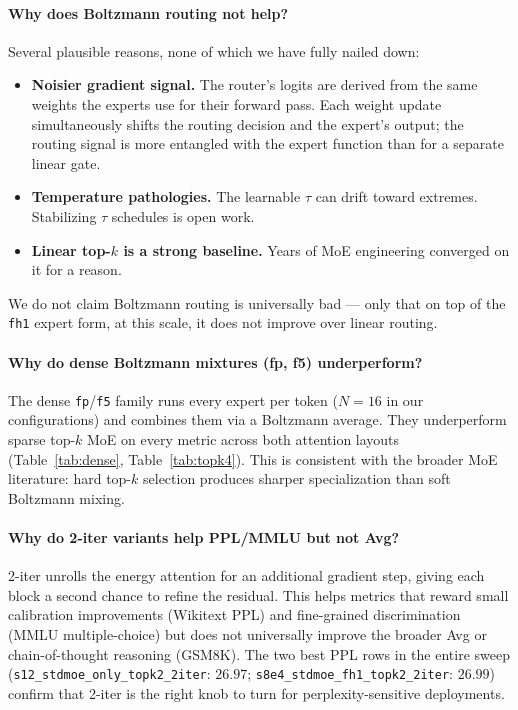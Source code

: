 \documentclass[oneside]{article}
\begin{document}
\paragraph{Why does Boltzmann routing not help?}
Several plausible reasons, none of which we have fully nailed down:
\begin{itemize}[leftmargin=1.5em]
  \item \textbf{Noisier gradient signal.} The router's logits are
        derived from the same weights the experts use for their forward
        pass. Each weight update simultaneously shifts the routing
        decision and the expert's output; the routing signal is more
        entangled with the expert function than for a separate linear
        gate.
  \item \textbf{Temperature pathologies.} The learnable $\tau$ can
        drift toward extremes. Stabilizing $\tau$ schedules is open
        work.
  \item \textbf{Linear top-$k$ is a strong baseline.} Years of MoE
        engineering converged on it for a reason.
\end{itemize}
We do not claim Boltzmann routing is universally bad --- only that on
top of the \texttt{fh1} expert form, at this scale, it does not
improve over linear routing.

\paragraph{Why do dense Boltzmann mixtures (fp, f5) underperform?}
The dense \texttt{fp}/\texttt{f5} family runs every expert per token
($N=16$ in our configurations) and combines them via a Boltzmann
average. They underperform sparse top-$k$ MoE on every metric across
both attention layouts (Table~\ref{tab:dense}, Table~\ref{tab:topk4}).
This is consistent with the broader MoE literature: hard top-$k$
selection produces sharper specialization than soft Boltzmann mixing.

\paragraph{Why do 2-iter variants help PPL/MMLU but not Avg?}
2-iter unrolls the energy attention for an additional gradient step,
giving each block a second chance to refine the residual. This helps
metrics that reward small calibration improvements (Wikitext PPL) and
fine-grained discrimination (MMLU multiple-choice) but does not
universally improve the broader Avg or chain-of-thought reasoning
(GSM8K). The two best PPL rows in the entire sweep
(\texttt{s12\_stdmoe\_only\_topk2\_2iter}: $26.97$;
\texttt{s8e4\_stdmoe\_fh1\_topk2\_2iter}: $26.99$) confirm that 2-iter
is the right knob to turn for perplexity-sensitive deployments.
\end{document}

